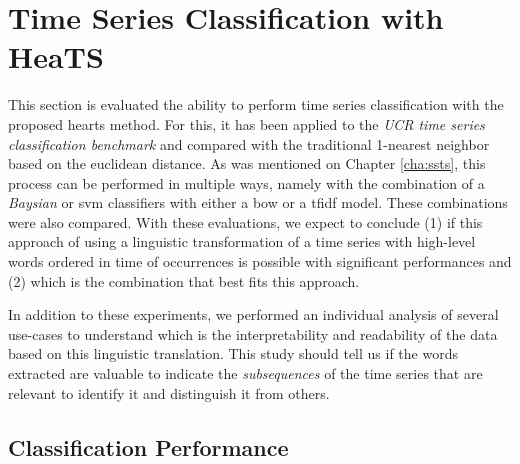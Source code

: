 \section{Time Series Classification with HeaTS}

This section is evaluated the ability to perform time series classification with the proposed \gls{hearts} method. For this, it has been applied to the \textit{UCR time series classification benchmark} and compared with the traditional 1-nearest neighbor based on the euclidean distance. As was mentioned on Chapter \ref{cha:ssts}, this process can be performed in multiple ways, namely with the combination of a \textit{Baysian} or \gls{svm} classifiers with either a \gls{bow} or a \gls{tfidf} model. These combinations were also compared. With these evaluations, we expect to conclude (1) if this approach of using a linguistic transformation of a time series with high-level words ordered in time of occurrences is possible with significant performances and (2) which is the combination that best fits this approach.
\par
In addition to these experiments, we performed an individual analysis of several use-cases to understand which is the interpretability and readability of the data based on this linguistic translation. This study should tell us if the words extracted are valuable to indicate the \textit{subsequences} of the time series that are relevant to identify it and distinguish it from others. 

\subsection{Classification Performance}

